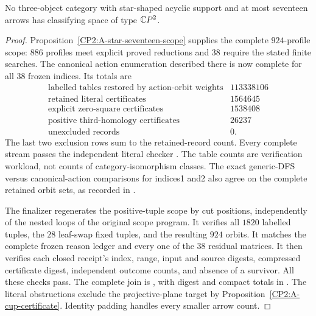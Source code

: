 \begin{theorem}
\label{CP2:A-star-seventeen-complete}
No three-object category with star-shaped acyclic support
and at most seventeen arrows has classifying space of type
$\mathbb{C}P^2$.
\end{theorem}
\begin{proof}
Proposition~\ref{CP2:A-star-seventeen-scope} supplies the
complete $924$-profile scope: $886$ profiles meet explicit
proved reductions and $38$ require the stated finite searches.
The canonical action enumeration described there is now
complete for all $38$ frozen indices. Its totals are
\[
\begin{array}{l|r}
\text{labelled tables restored by action-orbit weights}&113338106\\
\text{retained literal certificates}&1564645\\
\text{explicit zero-square certificates}&1538408\\
\text{positive third-homology certificates}&26237\\
\text{unexcluded records}&0.
\end{array}
\]
The last two exclusion rows sum to the retained-record
count. Every complete stream passes the independent
literal checker .
The table counts are verification workload, not counts
of category-isomorphism classes. The exact generic-DFS
versus canonical-action comparisons for indices1 and2
also agree on the complete retained orbit sets, as
recorded in .

The finalizer 
regenerates the positive-tuple scope by cut positions,
independently of the nested loops of the original scope
program. It verifies all $1820$ labelled tuples, the $28$
leaf-swap fixed tuples, and the resulting $924$ orbits.
It matches the complete frozen reason ledger and every
one of the $38$ residual matrices. It then verifies each
closed receipt's index, range, input and source digests,
compressed certificate digest, independent outcome counts,
and absence of a survivor. All these checks pass.
The complete join is
,
with digest and compact totals in
.
The literal obstructions exclude the projective-plane
target by Proposition~\ref{CP2:A-cup-certificate}.
Identity padding handles every smaller arrow count.
\end{proof}
